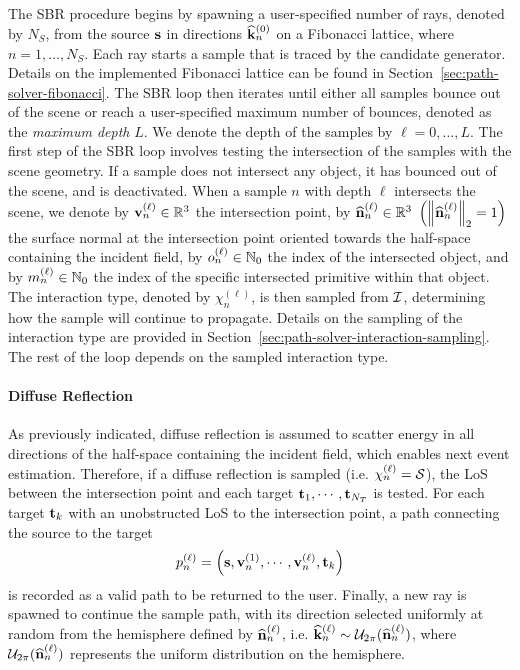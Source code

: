 The \gls{SBR} procedure begins by spawning a user-specified number of rays, denoted by $N_S$, from the source $\mathbf{s}$ in directions $\widehat{\mathbf{k}}_n^{(0)}$ on a Fibonacci lattice, where $n = 1, \dots, N_S$.
Each ray starts a sample that is traced by the candidate generator.
Details on the implemented Fibonacci lattice can be found in Section~\ref{sec:path-solver-fibonacci}.
The \gls{SBR} loop then iterates until either all samples bounce out of the scene or reach a user-specified maximum number of bounces, denoted as the \emph{maximum depth} $L$.
We denote the depth of the samples by $\ell = 0, \dots, L$.
The first step of the \gls{SBR} loop involves testing the intersection of the samples with the scene geometry.
If a sample does not intersect any object, it has bounced out of the scene, and is deactivated.
When a sample $n$ with depth $\ell$ intersects the scene, we denote by $\mathbf{v}_n^{(\ell)} \in \mathbb{R}^3$ the intersection point, by $\widehat{\mathbf{n}}_n^{(\ell)} \in \mathbb{R}^3~\left( \left\lVert\widehat{\mathbf{n}}_n^{(\ell)}\right\rVert_2 = 1 \right)$ the surface normal at the intersection point oriented towards the half-space containing the incident field, by $o_n^{(\ell)} \in \mathbb{N}_0$ the index of the intersected object, and by $m_n^{(\ell)} \in \mathbb{N}_0$ the index of the specific intersected primitive within that object.
The interaction type, denoted by $\chi_n^{(\ell)}$, is then sampled from ${\cal I}$, determining how the sample will continue to propagate.
Details on the sampling of the interaction type are provided in Section~\ref{sec:path-solver-interaction-sampling}.
The rest of the loop depends on the sampled interaction type.

\paragraph{Diffuse Reflection}
As previously indicated, diffuse reflection is assumed to scatter energy in all directions of the half-space containing the incident field, which enables next event estimation.
Therefore, if a diffuse reflection is sampled (i.e. $\chi_n^{(\ell)} = {\cal S}$), the \gls{LoS} between the intersection point and each target $\mathbf{t}_1, \cdots, \mathbf{t}_{N_T}$ is tested.
For each target $\mathbf{t}_k$ with an unobstructed \gls{LoS} to the intersection point, a path connecting the source to the target
\begin{equation}
    \label{eq:path-solver-sample-path}
    p_n^{(\ell)} = \left(\mathbf{s}, \mathbf{v}_n^{(1)}, \cdots, \mathbf{v}_n^{(\ell)}, \mathbf{t}_k\right)
\end{equation}
is recorded as a valid path to be returned to the user.
Finally, a new ray is spawned to continue the sample path, with its direction selected uniformly at random from the hemisphere defined by $\widehat{\mathbf{n}}_n^{(\ell)}$, i.e. $\widehat{\mathbf{k}}_{n}^{(\ell)} \sim {\cal U}_{2\pi}(\widehat{\mathbf{n}}_n^{(\ell)})$, where ${\cal U}_{2\pi}(\widehat{\mathbf{n}}_n^{(\ell)})$ represents the uniform distribution on the hemisphere.

